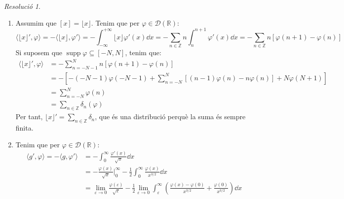 \documentclass[10pt,a4paper]{article}
\newcommand{\ZZ}{\ensuremath{\mathbb{Z}}} %
\newcommand{\RR}{\ensuremath{\mathbb{R}}} %
\DeclareMathOperator{\supp}{\mathrm{supp}} %
\theoremstyle{definition}
\theoremstyle{remark}
\newtheorem*{res}{Resolució}
\begin{document}
\begin{res}\hfill
  \begin{enumerate}
    \item Assumim que $[x]=\lfloor x\rfloor$. Tenim que per $\varphi\in\mathcal{D}(\RR)$:
          $$
            \langle \lfloor x\rfloor',\varphi\rangle=-\langle\lfloor x\rfloor,\varphi'\rangle=-\int_{-\infty}^{+\infty} \lfloor x\rfloor\varphi'(x)\dd{x}=-\sum_{n\in\ZZ}n\int_{n}^{n+1} \varphi'(x)\dd{x}=-\sum_{n\in\ZZ}n[\varphi(n+1)-\varphi(n)]
          $$
          Si suposem que $\supp\varphi\subseteq [-N,N]$, tenim que:
          \begin{align*}
            \langle \lfloor x\rfloor',\varphi\rangle & =-\sum_{n=-N-1}^{N}n[\varphi(n+1)-\varphi(n)]                                                   \\
                                                     & =-\left[-(-N-1)\varphi(-N-1)+\sum_{n=-N}^{N}[(n-1)\varphi(n)-n\varphi(n)]+ N\varphi(N+1)\right] \\
                                                     & =\sum_{n=-N}^{N}\varphi(n)                                                                      \\
                                                     & =\sum_{n\in\ZZ} \delta_n(\varphi)
          \end{align*}
          Per tant, $\lfloor x\rfloor'=\sum_{n\in\ZZ}\delta_n$, que és una distribució perquè la suma és sempre finita.
    \item Tenim que per $\varphi\in\mathcal{D}(\RR)$:
          \begin{align*}
            \langle g',\varphi\rangle=-\langle g,\varphi'\rangle & =-\int_0^{\infty}\frac{\varphi'(x)}{\sqrt{x}}\dd{x}                                                                                                                                                                             \\
                                                                 & =-\frac{\varphi(x)}{\sqrt{x}}\bigg|_0^\infty-\frac{1}{2}\int_0^\infty \frac{\varphi(x)}{x^{3/2}}\dd{x}                                                                                                                          \\
                                                                 & =\lim_{\varepsilon\to 0}\frac{\varphi(\varepsilon)}{\sqrt{\varepsilon}}-\frac{1}{2}\lim_{\varepsilon\to 0}\int_\varepsilon^\infty \left(\frac{\varphi(x)-\varphi(0)}{x^{3/2}}+\frac{\varphi(0)}{x^{3/2}}\right)\dd{x}           \\

\end{align*}
\end{enumerate}
\end{res}
\end{document}
